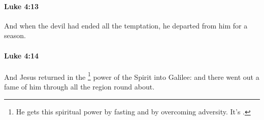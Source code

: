 		\paragraph{Luke 4:13} %
			\label{LUKE-4-13}

			And when the devil had ended all the temptation, he departed from him for a season.

			\begin{framed}
			\scriptsize
				\begin{compactdesc}
					\item[SBLG] 
				\end{compactdesc}
			\end{framed}

		\paragraph{Luke 4:14} %
			\label{LUKE-4-14}

			And Jesus returned in the
				\footnote{%
					He gets this spiritual power by fasting and by overcoming adversity. It's .
					}%
			power of the Spirit into Galilee: and there went out a fame of him through all the region round about.

